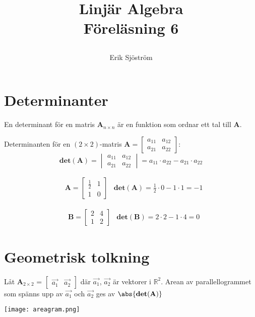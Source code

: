  
\title{
	 Linjär Algebra\\
	 Föreläsning 6
    \author{Erik Sjöström}
}

\maketitle

\section{Determinanter} %
\label{sec:matrisvektorprodukt}

En determinant för en matris $\textbf{A}_{n \times n}$ är en funktion som ordnar ett tal till \textbf{A}.
\begin{Def}
    Determinanten för en $(2 \times 2)$-matris $\mathbf{A} = \begin{bmatrix} a_{11}&a_{12}\\a_{21}&a_{22} \end{bmatrix}$:
    \[
        \mathbf{det}(\mathbf{A}) = \begin{vmatrix} a_{11}&a_{12}\\a_{21}&a_{22} \end{vmatrix} = a_{11} \cdot a_{22} - a_{21} \cdot a_{22}
    \]
\end{Def}
\begin{Ex}
    \begin{align*}
    &\mathbf{A} = \begin{bmatrix} \frac{1}{2}&1\\1&0 \end{bmatrix} &\mathbf{det}(\mathbf{A}) = \frac{1}{2} \cdot 0 - 1 \cdot 1 = -1
    \end{align*}
\end{Ex}

\begin{Ex}
    \begin{align*}
    &\mathbf{B} = \begin{bmatrix} 2&4\\1&2 \end{bmatrix} & \mathbf{det}(\mathbf{B}) = 2 \cdot 2 - 1 \cdot 4 = 0
    \end{align*}
\end{Ex}

\section{Geometrisk tolkning} %
\label{sec:geometrisk_tolkning}
\begin{sats}
    Låt $\mathbf{A}_{2 \times 2}$ = $\begin{bmatrix} \vec{a_1} &\vec{a_2} \end{bmatrix}$ där $\vec{a_1}$, $\vec{a_2}$ är vektorer i $\mathbb{R}^2$. Arean av parallellogrammet som spänns upp av $\vec{a_1}$ och $\vec{a_2}$ ges av $\abs{\mathbf{det}(\mathbf{A})}$
    \begin{center}
        \texttt{[image: areagram.png]}
    \end{center}
\end{sats}

